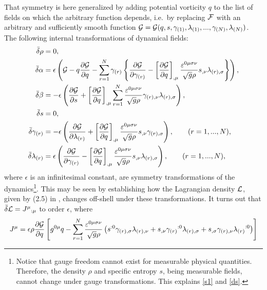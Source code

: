 \documentclass{article}
\numberwithin{equation}{section}
\begin{document}
That symmetry is here generalized by adding potential vorticity $q$ to the list of fields on which the arbitrary function depends, i.e.\ by replacing ${\cal F}$ with an arbitrary and sufficiently smooth function ${\cal G}={\cal G}(q,s,\gamma_{(1)},\lambda_{(1)},...,\gamma_{(N)},\lambda_{(N)})$. The following internal transformations of dynamical fields:
\begin{subequations}
\begin{align}
\bar\delta\rho &= 0, \label{s1} \\
\bar\delta\alpha &= \epsilon \left( {\cal G}-q\frac{\partial{\cal G}}{\partial q} -\sum_{r=1}^N\gamma_{(r)}\left\{\frac{\partial{\cal G}}{\partial \gamma_{(r)}} - \left[\frac{\partial{\cal G}}{\partial q}\right]_{,\mu} \frac{\varepsilon^{0\mu\sigma\nu}}{\sqrt{g}\rho} s_{,\nu} \lambda_{(r),\sigma}\right\} \right), \\
\bar\delta\beta &= -\epsilon \left( \frac{\partial{\cal G}}{\partial s} + \left[\frac{\partial{\cal G}}{\partial q}\right]_{,\mu}\sum_{r=1}^N \frac{\varepsilon^{0\mu\sigma\nu}}{\sqrt{g}\rho} \gamma_{(r),\nu} \lambda_{(r),\sigma} \right), \\
\bar\delta s &= 0, \label{ds} \\
\bar\delta\gamma_{(r)} &= -\epsilon \left( \frac{\partial{\cal G}}{\partial \lambda_{(r)}} +\left[\frac{\partial{\cal G}}{\partial q}\right]_{,\mu} \frac{\varepsilon^{0\mu\sigma\nu}}{\sqrt{g}\rho} s_{,\nu}\gamma_{(r),\sigma} \right), \qquad (r=1,...,N), \\
\bar\delta\lambda_{(r)} &= \epsilon \left( \frac{\partial{\cal G}}{\partial \gamma_{(r)}} -\left[\frac{\partial{\cal G}}{\partial q}\right]_{,\mu} \frac{\varepsilon^{0\mu\sigma\nu}}{\sqrt{g}\rho} s_{,\nu}\lambda_{(r),\sigma} \right), \qquad (r=1,...,N), \label{s2}
\end{align}
\end{subequations}
where $\epsilon$ is an infinitesimal constant, are symmetry transformations of the dynamics\footnote[2]{Notice that gauge freedom cannot exist for measurable physical quantities. Therefore, the density $\rho$ and specific entropy $s$, being measurable fields, cannot change under gauge transformations. This explains \eqref{s1} and \eqref{ds}.}. This may be seen by establishing how the Lagrangian density $\cal L$, given by (2.5) in \cite{Charron18b}, changes off-shell under these transformations. It turns out that $\bar\delta{\cal L}={J^\mu}_{:\mu}$ to order $\epsilon$, where
\begin{align}
J^\mu = \epsilon \rho\frac{\partial{\cal G}}{\partial q} \left[g^{0\mu}q-\sum_{r=1}^N \frac{\varepsilon^{0\mu\sigma\nu}}{\sqrt{g}\rho} \left( s^{:0}\gamma_{(r),\sigma} \lambda_{(r),\nu} + s_{,\nu} {\gamma_{(r)}}^{:0}\lambda_{(r),\sigma} + s_{,\sigma}\gamma_{(r),\nu} {\lambda_{(r)}}^{:0} \right) \right]
\end{align}
\end{document}

